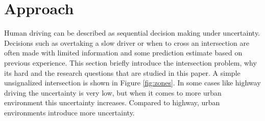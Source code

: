  
 






\section{Approach}
Human driving can be described as sequential decision making under uncertainty. Decisions such as overtaking a slow driver or when to cross an intersection are often made with limited information and some prediction estimate based on previous experience. 
This section briefly introduce the intersection problem, why its hard and the research questions that are studied in this paper. 
A simple unsignalized intersection is shown in Figure \ref{fig:zones}.
In some cases like highway driving the uncertainty is very low, but when it comes to more urban environment this uncertainty increases. Compared to highway, urban environments introduce more uncertainty. 

